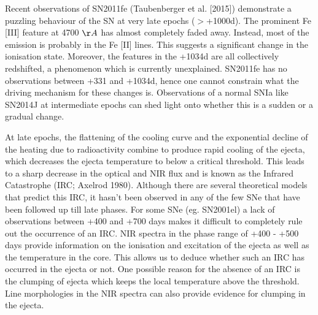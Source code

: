 \documentclass[11pt]{article}
\begin{document}
Recent observations of SN2011fe (Taubenberger et al. [2015]) demonstrate a puzzling behaviour of the SN at very late epochs ($>$+1000d). The prominent Fe [III] feature at 4700 $\AA$ has almost completely faded away. Instead, most of the emission is probably in the Fe [II] lines. This suggests a significant change in the ionisation state. Moreover, the features in the +1034d are all collectively redshifted, a phenomenon which is currently unexplained. SN2011fe has no observations between +331 and +1034d, hence one cannot constrain what the driving mechanism for these changes is. Observations of a normal SNIa like SN2014J at intermediate epochs can shed light onto whether this is a sudden or a gradual change. 

 At late epochs, the flattening of the cooling curve and the exponential decline of the heating due to radioactivity combine to produce rapid cooling of the ejecta, which decreases the ejecta temperature to below a critical threshold. This leads to a sharp decrease in the optical and NIR flux and is known as the Infrared Catastrophe (IRC; Axelrod 1980). Although there are several theoretical models that predict this IRC, it hasn't been observed in any of the few SNe that have been followed up till late phases. For some SNe (eg. SN2001el) a lack of observations between +400 and +700 days makes it difficult to completely rule out the occurrence of an IRC. NIR spectra in the phase range of +400 - +500 days provide information on the ionisation and excitation of the ejecta as well as the temperature in the core. This allows us to deduce whether such an IRC has occurred in the ejecta or not. One possible reason for the absence of an IRC is the clumping of ejecta which keeps the local temperature above the threshold. Line morphologies in the NIR spectra can also provide evidence for clumping in the ejecta.   
 
\end{document}
